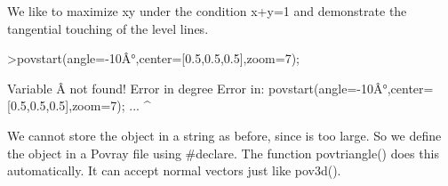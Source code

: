 \documentclass[a4paper,10pt]{article}
\begin{document}
\begin{eulernotebook}
\begin{eulercomment}
We like to maximize xy under the condition x+y=1 and demonstrate the tangential touching of the level lines.
\end{eulercomment}
\begin{eulerprompt}
>povstart(angle=-10Â°,center=[0.5,0.5,0.5],zoom=7);
\end{eulerprompt}
\begin{euleroutput}
  Variable Â not found!
  Error in degree
  Error in:
  povstart(angle=-10Â°,center=[0.5,0.5,0.5],zoom=7); ...
                      ^
\end{euleroutput}
\begin{eulercomment}
We cannot store the object in a string as before, since is too large. So we define the object in a Povray file using
#declare. The function povtriangle() does this automatically. It can accept normal vectors just like pov3d().


\end{eulercomment}
\end{eulernotebook}
\end{document}
